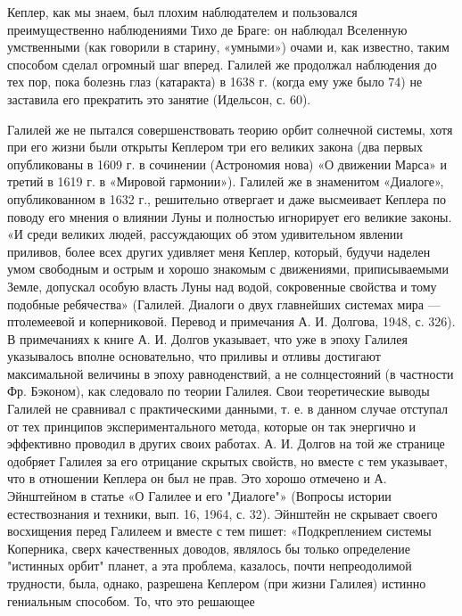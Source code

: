 Кеплер,  как   мы  знаем,   был  плохим  наблюдателем   и  пользовался
преимущественно  наблюдениями Тихо  де  Браге:  он наблюдал  Вселенную
умственными (как говорили в старину,  «умными») очами и, как известно,
таким  способом  сделал  огромный  шаг вперед.  Галилей  же  продолжал
наблюдения до тех пор, пока болезнь  глаз (катаракта) в 1638 г. (когда
ему уже было 74) не заставила его прекратить это занятие (Идельсон, с.
60).

Галилей же не пытался совершенствовать теорию орбит солнечной системы,
хотя при его  жизни были открыты Кеплером три его  великих закона (два
первых  опубликованы  в  1609  г. в  сочинении  (Астрономия  нова)  «О
движении Марса» и третий в 1619 г. в «Мировой гармонии»). Галилей же в
знаменитом «Диалоге», опубликованном в 1632 г., решительно отвергает и
даже  высмеивает  Кеплера  по  поводу  его мнения  о  влиянии  Луны  и
полностью  игнорирует  его великие  законы.  «И  среди великих  людей,
рассуждающих об этом удивительном  явлении приливов, более всех других
удивляет  меня  Кеплер,  который,  будучи  наделен  умом  свободным  и
острым и хорошо знакомым  с движениями, приписываемыми Земле, допускал
особую власть  Луны над  водой, сокровенные  свойства и  тому подобные
ребячества»  (Галилей. Диалоги  о  двух главнейших  системах мира  ---
птолемеевой  и  коперниковой.  Перевод  и примечания  А.  И.  Долгова,
1948,  с. 326).  В примечаниях  к книге  А. И.  Долгов указывает,  что
уже  в  эпоху Галилея  указывалось  вполне  основательно, что  приливы
и  отливы  достигают  максимальной  величины  в  эпоху  равноденствий,
а  не  солнцестояний  (в  частности Фр.  Бэконом),  как  следовало  по
теории  Галилея.  Свои теоретические  выводы  Галилей  не сравнивал  с
практическими данными, т. е. в данном случае отступал от тех принципов
экспериментального  метода,  которые  он так  энергично  и  эффективно
проводил  в других  своих работах.  А. И.  Долгов на  той же  странице
одобряет Галилея  за его  отрицание скрытых свойств,  но вместе  с тем
указывает, что в отношении Кеплера он был не прав. Это хорошо отмечено
и А. Эйнштейном в статье «О  Галилее и его "Диалоге"» (Вопросы истории
естествознания и техники, вып. 16,  1964, с. 32). Эйнштейн не скрывает
своего восхищения перед Галилеем и  вместе с тем пишет: «Подкреплением
системы  Коперника, сверх  качественных  доводов,  являлось бы  только
определение  "истинных  орбит"  планет,   а  эта  проблема,  казалось,
почти непреодолимой  трудности, была, однако, разрешена  Кеплером (при
жизни  Галилея)  истинно гениальным  способом.  То,  что это  решающее
